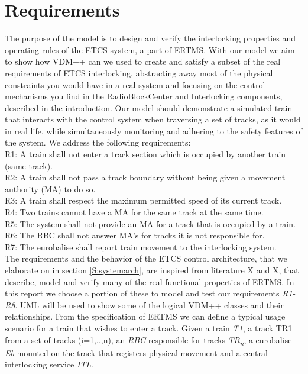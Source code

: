 \documentclass[preprint,12pt]{elsarticle}
\begin{document}
\section{Requirements}
\label{S:requirements}
The purpose of the model is to design and verify the interlocking properties and operating rules of the ETCS system, a part of ERTMS. With our model we aim to show how VDM++ can we used to create and satisfy a subset of the real requirements of ETCS interlocking, abstracting away most of the physical constraints you would have in a real system and focusing on the control mechanisms you find in the RadioBlockCenter and Interlocking components, described in the introduction. Our model should demonstrate a simulated train that interacts with the control system when traversing a set of tracks, as it would in real life, while simultaneously monitoring and adhering to the safety features of the system. We address the following requirements: \\

R1: A train shall not enter a track section which is occupied by another train (same track).\\
R2: A train shall not pass a track boundary without being given a movement authority (MA) to do so.\\
R3: A train shall respect the maximum permitted speed of its current track.\\
R4: Two trains cannot have a MA for the same track at the same time.\\
R5: The system shall not provide an MA for a track that is occupied by a train.\\
R6: The RBC shall not answer MA's for tracks it is not responsible for.\\
R7: The eurobalise shall report train movement to the interlocking system.\\

The requirements and the behavior of the ETCS control architecture, that we elaborate on in section \ref{S:systemarch}, are inspired from literature X and X, that describe, model and verify many of the real functional properties of ERTMS. In this report we choose a portion of these to model and test our requirements \textit{R1-R8}. UML will be used to show some of the logical VDM++ classes and their relationships. From the specification of ERTMS we can define a typical usage scenario for a train that wishes to enter a track. Given a train \textit{T1}, a track TR1 from a set of tracks (i=1,..,n), an \textit{RBC} responsible for tracks \textit{TR\textsubscript{n}}, a eurobalise \textit{Eb} mounted on the track that registers physical movement and a central interlocking service \textit{ITL}.
\end{document}
